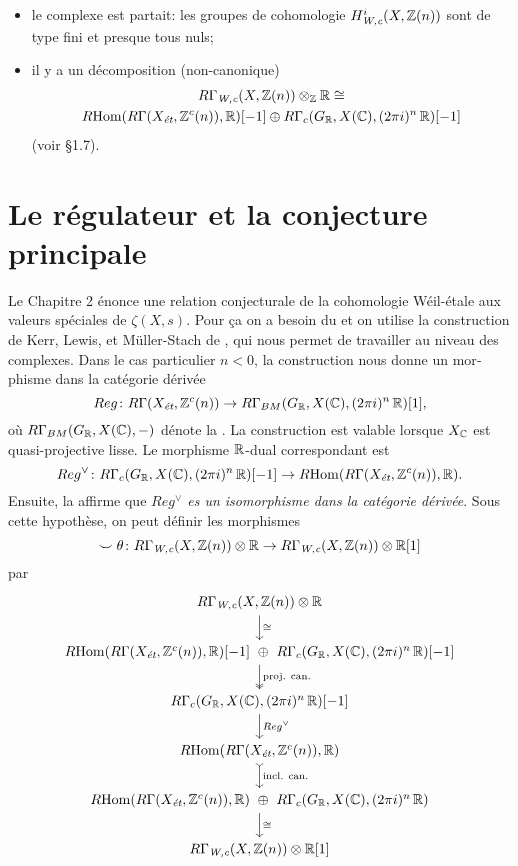 \begin{otherlanguage}{french}
  \begin{itemize}
  \item le complexe est partait: les groupes de cohomologie
    $H^i_\text{\it W,c} (X,\mathbb{Z}(n))$ sont de type fini et presque tous nuls;

  \item il y a un décomposition (non-canonique)
    \begin{multline*}
      R\Gamma_\text{\it W,c} (X,\mathbb{Z} (n))\otimes_{\mathbb{Z}} \mathbb{R} \cong \\
      R\!\operatorname{Hom} (R\Gamma (X_\text{\it ét}, \mathbb{Z}^c (n)), \mathbb{R}) [-1]
      \oplus
      R\Gamma_c (G_{\mathbb{R}}, X (\mathbb{C}), (2\pi i)^n\,\mathbb{R}) [-1]
    \end{multline*}
    (voir \S 1.7).
  \end{itemize}

  \section*{Le régulateur et la conjecture principale}

  Le Chapitre 2 énonce une relation conjecturale de la cohomologie Wéil-étale
  aux valeurs spéciales de $\zeta (X,s)$. Pour ça on a besoin du
   et on utilise la construction de Kerr, Lewis, et
  M\"uller-Stach de \cite{Kerr-Lewis-Muller-Stach-2006}, qui nous permet de
  travailler au niveau des complexes. Dans le cas particulier $n < 0$,
  la construction nous donne un morphisme dans la catégorie dérivée
  \[ Reg\colon R\Gamma (X_\text{\it ét}, \mathbb{Z}^c (n)) \to
    R\Gamma_{BM} (G_{\mathbb{R}}, X (\mathbb{C}), (2\pi i)^n\,\mathbb{R}) [1], \]
  où $R\Gamma_{BM} (G_{\mathbb{R}}, X (\mathbb{C}), -)$ dénote la
  . La construction est valable
  lorsque $X_{\mathbb{C}}$ est quasi-projective lisse. Le morphisme $\mathbb{R}$-dual
  correspondant est
  \[ Reg^\vee\colon R\Gamma_c (G_{\mathbb{R}}, X (\mathbb{C}), (2\pi i)^n\,\mathbb{R}) [-1] \to
    R\!\operatorname{Hom} (R\Gamma (X_\text{\it ét}, \mathbb{Z}^c (n)), \mathbb{R}). \]
  Ensuite, la  affirme que
  \emph{$Reg^\vee$ es un isomorphisme dans la catégorie dérivée}. Sous cette
  hypothèse, on peut définir les morphismes
  \[ \smile\theta\colon R\Gamma_\text{\it W,c} (X, \mathbb{Z} (n)) \otimes \mathbb{R} \to
    R\Gamma_\text{\it W,c} (X, \mathbb{Z} (n)) \otimes \mathbb{R} [1] \]
  par
  \[ \begin{tikzcd}
      R\Gamma_\text{\it W,c} (X, \ZZ (n)) \otimes \RR \ar{d}{\isom} \\
      \RHom (R\Gamma (X_\text{\it ét}, \ZZ^c (n)), \RR) [-1] ~\oplus~ R\Gamma_c (G_\RR, X (\CC), (2\pi i)^n\,\RR) [-1] \ar[twoheadrightarrow]{d}{\text{proj. can.}} \\
      R\Gamma_c (G_\RR, X (\CC), (2\pi i)^n\,\RR) [-1] \ar{d}{Reg^\vee} \\
      \RHom (R\Gamma (X_\text{\it ét}, \ZZ^c (n)), \RR) \ar[rightarrowtail]{d}{\text{incl. can.}} \\
      \RHom (R\Gamma (X_\text{\it ét}, \ZZ^c (n)), \RR) ~\oplus~ R\Gamma_c (G_\RR, X (\CC), (2\pi i)^n\,\RR) \ar{d}{\isom} \\
      R\Gamma_\text{\it W,c} (X, \ZZ (n)) \otimes \RR [1]
    \end{tikzcd} \]


\end{otherlanguage}
